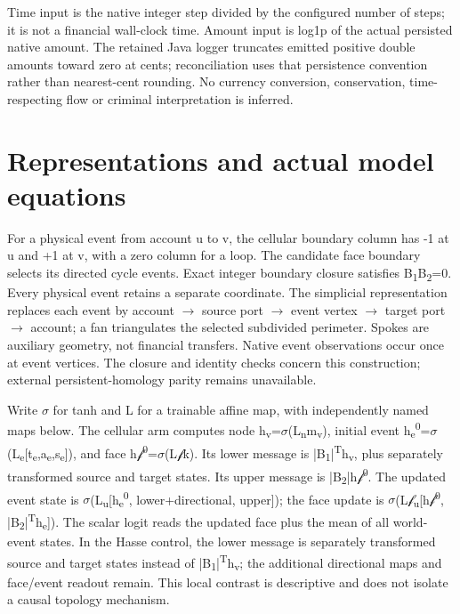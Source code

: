 \documentclass{article}
\begin{document}
Time input is the native integer step divided by the configured number of steps; it is not a financial wall-clock time. Amount input is log1p of the actual persisted native amount. The retained Java logger truncates emitted positive double amounts toward zero at cents; reconciliation uses that persistence convention rather than nearest-cent rounding. No currency conversion, conservation, time-respecting flow or criminal interpretation is inferred.

\section{Representations and actual model equations}

For a physical event from account u to v, the cellular boundary column has -1 at u and +1 at v, with a zero column for a loop. The candidate face boundary selects its directed cycle events. Exact integer boundary closure satisfies B\textsubscript{1}B\textsubscript{2}=0. Every physical event retains a separate coordinate. The simplicial representation replaces each event by account \(\to\) source port \(\to\) event vertex \(\to\) target port \(\to\) account; a fan triangulates the selected subdivided perimeter. Spokes are auxiliary geometry, not financial transfers. Native event observations occur once at event vertices. The closure and identity checks concern this construction; external persistent-homology parity remains unavailable.

Write \(\sigma\) for tanh and L for a trainable affine map, with independently named maps below. The cellular arm computes node h\textsubscript{v}=\(\sigma\)(L\textsubscript{n}m\textsubscript{v}), initial event h\textsubscript{e}\textsuperscript{0}=\(\sigma\)(L\textsubscript{e}[t\textsubscript{e},a\textsubscript{e},s\textsubscript{e}]), and face h\(\mathcal{f}\)\textsuperscript{0}=\(\sigma\)(L\(\mathcal{f}\)k). Its lower message is |B\textsubscript{1}|\textsuperscript{T}h\textsubscript{v}, plus separately transformed source and target states. Its upper message is |B\textsubscript{2}|h\(\mathcal{f}\)\textsuperscript{0}. The updated event state is \(\sigma\)(L\textsubscript{u}[h\textsubscript{e}\textsuperscript{0}, lower+directional, upper]); the face update is \(\sigma\)(L\(\mathcal{f}\)\textsubscript{u}[h\(\mathcal{f}\)\textsuperscript{0}, |B\textsubscript{2}|\textsuperscript{T}h\textsubscript{e}]). The scalar logit reads the updated face plus the mean of all world-event states. In the Hasse control, the lower message is separately transformed source and target states instead of |B\textsubscript{1}|\textsuperscript{T}h\textsubscript{v}; the additional directional maps and face/event readout remain. This local contrast is descriptive and does not isolate a causal topology mechanism.
\end{document}
